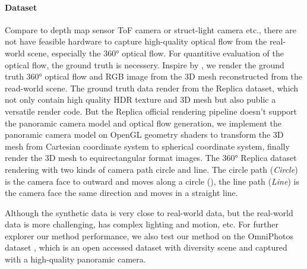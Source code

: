 \paragraph{Dataset}
%
%
%
Compare to depth map sensor ToF camera or struct-light camera etc., 
there are not have feasible hardware to capture high-quality optical flow from the real-world scene, especially the 360° optical flow.
%
For quantitive evaluation of the optical flow, the ground truth is necessery.
Inspire by \cite{shugrina2019creative}, we render the ground truth 360° optical flow and RGB image from the 3D mesh reconstructed from the read-world scene.
The ground truth data render from the Replica dataset\cite{StrauWMCWGEMRVCYBYPYZLCBGMPSBSNGLN2019}, which not only contain high quality HDR texture and 3D mesh but also public a versatile render code.
But the Replica official rendering pipeline doesn't support the panoramic camera model and optical flow generation, we implement the panoramic camera model on OpenGL geometry shaders to transform the 3D mesh from Cartesian coordinate system to spherical coordinate system, finally render the 3D mesh to equirectangular format images.
The 360° Replica dataset rendering with two kinds of camera path circle and line. The circle path (\emph{Circle}) is the camera face to outward and moves along a circle (), the line path (\emph{Line}) is the camera face the same direction and moves in a straight line.

Although the synthetic data is very close to real-world data, but the real-world data is more challenging, has complex lighting and motion, etc. 
%
For further explorer our method performance, we also test our method on the OmniPhotos dataset \cite{BerteYLR2020}, which is an open accessed dataset with diversity scene and captured with a high-quality panoramic camera.

